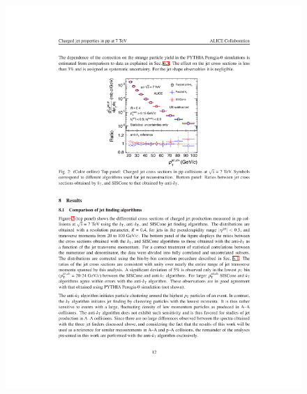 \begin{figure}
\centering
	\label{fig:cross_section_camparison}
\includegraphics{Data_Analysis/Isolation/charged_jet_cross_section}

\end{figure}
